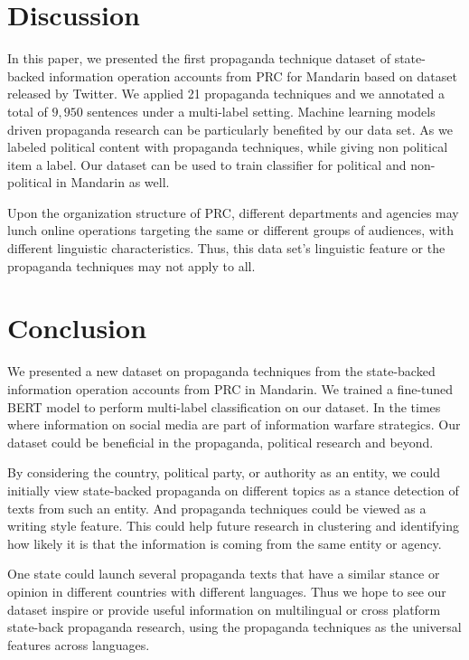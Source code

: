 \documentclass[sigconf]{acmart}
\begin{document}
\section{Discussion}
In this paper, we presented the first propaganda technique dataset of state-backed information operation accounts from PRC for Mandarin based on dataset released by Twitter. We applied 21 propaganda techniques and we annotated a total of $ 9,950$ sentences under a multi-label setting. Machine learning models driven propaganda research can be particularly benefited by our data set. As we labeled political content with propaganda techniques, while giving non political item a label. Our dataset can be used to train classifier for political and non-political in Mandarin as well.

Upon the organization structure of PRC, different departments and agencies may lunch online operations targeting the same or different groups of audiences, with different linguistic characteristics. Thus, this data set's linguistic feature or the propaganda techniques may not apply to all. 

\section{Conclusion}

We presented a new dataset on propaganda techniques from the state-backed information operation accounts from PRC in Mandarin. We trained a fine-tuned BERT model to perform multi-label classification on our dataset. In the times where information on social media are part of information warfare strategics. Our dataset could be beneficial in the propaganda, political research and beyond.

By considering the country, political party, or authority as an entity, we could initially view state-backed propaganda on different topics as a stance detection of texts from such an entity. And propaganda techniques could be viewed as a writing style feature. This could help future research in clustering and identifying how likely it is that the information is coming from the same entity or agency.

One state could launch several propaganda texts that have a similar stance or opinion in different countries with different languages. Thus we hope to see our dataset inspire or provide useful information on multilingual or cross platform state-back propaganda research, using the propaganda techniques as the universal features across languages. 




\pagebreak
\end{document}
